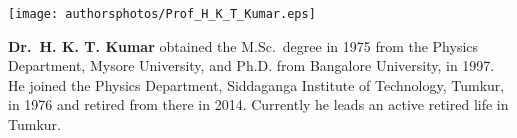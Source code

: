 \drawline
\bigskip
\bigskip

\centerline{\texttt{[image: authorsphotos/Prof\_H\_K\_T\_Kumar.eps]}}
\bigskip

\noindent
{\biofntsize\textbf{Dr.\ H. K. T. Kumar} obtained the M.Sc.\ degree in 1975 from the Physics Department, Mysore University, and  Ph.D. from Bangalore University, in 1997. He joined the Physics Department, Siddaganga Institute of Technology, Tumkur, in 1976 and retired from there in 2014. Currently he leads an active retired life in Tumkur.}
